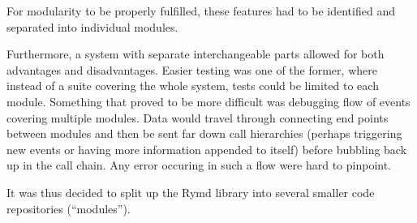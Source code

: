 For modularity to be properly fulfilled, these features had to be identified and separated into individual modules.


Furthermore, a system with separate interchangeable parts allowed for both advantages and disadvantages. Easier testing was one of the former, where instead of a suite covering the whole system, tests could be limited to each module. Something that proved to be more difficult was debugging flow of events covering multiple modules. Data would travel through connecting end points between modules and then be sent far down call hierarchies (perhaps triggering new events or having more information appended to itself) before bubbling back up in the call chain. Any error occuring in such a flow were hard to pinpoint.

It was thus decided to split up the Rymd library into several smaller code repositories (“modules”).
